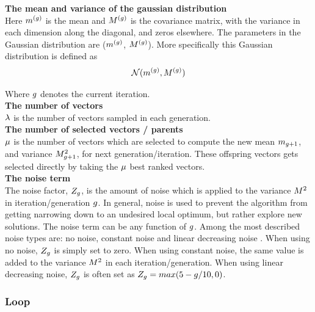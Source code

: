 \textbf{The mean and variance of the gaussian distribution} \\
Here $m^{(g)}$ is the mean and  
$M^{(g)}$ is the covariance matrix, with 
the variance in each dimension along the diagonal, and zeros elsewhere. 
The parameters in the Gaussian distribution are ($m^{(g)}$,
$M^{(g)}$). 
More specifically this Gaussian distribution is defined as 
\begin{align*}
\mathcal{N}(m^{(g)},M^{(g)})
\end{align*}

Where $g$ denotes the current iteration.\\


\textbf{The number of vectors}\\
$\lambda$ is the number of vectors sampled in each generation.
\\

\textbf{The number of selected vectors / parents}\\
$\mu$ is the number of vectors which are selected to compute 
the new mean $m_{g + 1}$, and variance
$M^2_{g + 1}$, for next generation/iteration. 
These offspring vectors gets selected 
directly by taking the $\mu$ best ranked
vectors.
\\

\textbf{The noise term}\\
The noise factor, $Z_{g}$, 
is the amount of noise which 
is applied to the variance $M^2$ in
iteration/generation 
$g$. In general, noise is used to prevent
the algorithm from 
getting narrowing down to an undesired local optimum, but
rather explore new solutions.
The noise term can be any
function of $g$. Among 
the most described noise types are: no noise, constant noise 
and linear decreasing noise \citep{szita:06}. 
When using no noise, $Z_{g}$ 
is simply set to zero. When using constant noise, 
the same value is 
added to the variance $M^2$ 
in each iteration/generation. 
When using linear decreasing noise, 
$Z_{g}$ is often set as
$Z_{g}=max(5- g /10,0)$.
\\

\subsubsection{Loop}

